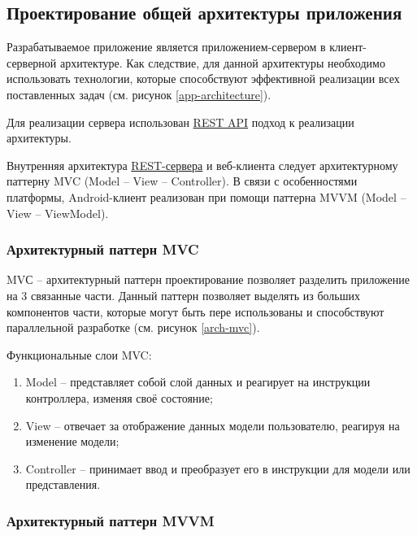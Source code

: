 \subsection{Проектирование общей архитектуры приложения}\label{subsec:2-design-architecure}\indent

Разрабатываемое приложение является приложением-сервером в клиент-серверной архитектуре.
Как следствие, для данной архитектуры необходимо использовать технологии, которые способствуют эффективной реализации всех поставленных задач (см. рисунок \ref{app-architecture}).


Для реализации сервера использован \hyperlink{gloss:rest}{REST API} подход к реализации архитектуры.

Внутренняя архитектура \hyperlink{gloss:rest}{REST-сервера} и веб-клиента следует архитектурному паттерну MVC (Model – View – Controller).
В связи с особенностями платформы, Android-клиент реализован при помощи паттерна MVVM (Model – View – ViewModel).

\subsubsection{Архитектурный паттерн MVC}\indent

MVС – архитектурный паттерн проектирование позволяет разделить приложение на 3 связанные части.
Данный паттерн позволяет выделять из больших компонентов части, которые могут быть пере использованы и способствуют параллельной разработке (см. рисунок \ref{arch-mvc}).


Функциональные слои MVC:
\begin{enumerate}
    \item Model – представляет собой слой данных и реагирует на инструкции контроллера, изменяя своё состояние;
    \item View – отвечает за отображение данных модели пользователю, реагируя на изменение модели;
    \item Controller – принимает ввод и преобразует его в инструкции для модели или представления.
\end{enumerate}

\subsubsection{Архитектурный паттерн MVVM}\indent

